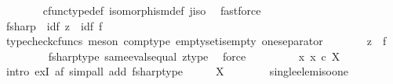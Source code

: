 \begin{isabellebody}
\ \ \ \ \ \ \isamarkupfalse%
\ cfunc{\isacharunderscore}{\kern0pt}type{\isacharunderscore}{\kern0pt}def\ isomorphism{\isacharunderscore}{\kern0pt}def\ j{\isacharunderscore}{\kern0pt}iso\ \isamarkupfalse%
\ fastforce\ \isanewline
\ \ \ \ \isamarkupfalse%
\ \isamarkupfalse%
\ f{\isacharunderscore}{\kern0pt}sharp\ {\isacharcolon}{\kern0pt}\ {\isachardoublequoteopen}id{\isacharparenleft}{\kern0pt}{\isasymemptyset}{\isacharparenright}{\kern0pt}{\isasymtimes}\isactrlsub f\ z\ {\isacharequal}{\kern0pt}\ id{\isacharparenleft}{\kern0pt}{\isasymemptyset}{\isacharparenright}{\kern0pt}{\isasymtimes}\isactrlsub f\ f\isactrlsup {\isasymsharp}{\isachardoublequoteclose}\isanewline
\ \ \ \ \ \ \isamarkupfalse%
\ {\isacharparenleft}{\kern0pt}typecheck{\isacharunderscore}{\kern0pt}cfuncs{\isacharcomma}{\kern0pt}\ meson\ comp{\isacharunderscore}{\kern0pt}type\ emptyset{\isacharunderscore}{\kern0pt}is{\isacharunderscore}{\kern0pt}empty\ one{\isacharunderscore}{\kern0pt}separator{\isacharparenright}{\kern0pt}\isanewline
\ \ \ \ \isamarkupfalse%
\ \isamarkupfalse%
\ {\isachardoublequoteopen}z\ {\isacharequal}{\kern0pt}\ f\isactrlsup {\isasymsharp}{\isachardoublequoteclose}\isanewline
\ \ \ \ \ \ \isamarkupfalse%
\ \ fsharp{\isacharunderscore}{\kern0pt}type\ same{\isacharunderscore}{\kern0pt}evals{\isacharunderscore}{\kern0pt}equal\ z{\isacharunderscore}{\kern0pt}type\ \isamarkupfalse%
\ force\isanewline
\ \ \isamarkupfalse%
\isanewline
\ \ \isamarkupfalse%
\ \isamarkupfalse%
\ {\isachardoublequoteopen}{\isasymexists}{\isacharbang}{\kern0pt}\ x{\isachardot}{\kern0pt}\ x\ {\isasymin}\isactrlsub c\ X\isactrlbsup {\isasymemptyset}\isactrlesup {\isachardoublequoteclose}\isanewline
\ \ \ \ \isamarkupfalse%
\ {\isacharparenleft}{\kern0pt}intro\ ex{}I{\isacharbrackleft}{\kern0pt}\ a{\isacharequal}{\kern0pt}{\isachardoublequoteopen}f\isactrlsup {\isasymsharp}{\isachardoublequoteclose}{\isacharbrackright}{\kern0pt}{\isacharcomma}{\kern0pt}\ simp{\isacharunderscore}{\kern0pt}all\ add{\isacharcolon}{\kern0pt}\ fsharp{\isacharunderscore}{\kern0pt}type{\isacharparenright}{\kern0pt}\isanewline
\ \ \isamarkupfalse%
\ \isamarkupfalse%
\ {\isachardoublequoteopen}X\isactrlbsup {\isasymemptyset}\isactrlesup \ {\isasymcong}\ {\isasymone}{\isachardoublequoteclose}\isanewline
\ \ \ \ \isamarkupfalse%
\ single{\isacharunderscore}{\kern0pt}elem{\isacharunderscore}{\kern0pt}iso{\isacharunderscore}{\kern0pt}one\ \isamarkupfalse%

\end{isabellebody}
